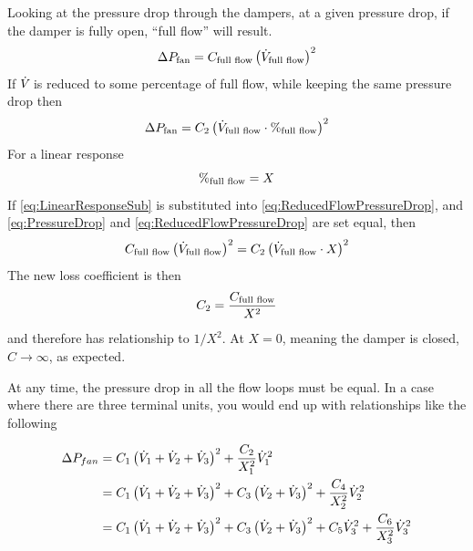 Looking at the pressure drop through the dampers, at a given pressure
drop, if the damper is fully open, ``full flow'' will result. 
\begin{equation}\label{eq:PressureDrop}
    \Delta P_{\text{fan}} = C_{\text{full flow}}\left(\dot{V}_{\text{full flow}}\right)^2
\end{equation}
%
If \(\dot{V}_{}\) is reduced to some percentage of full flow, while keeping
the same pressure drop then
\begin{equation}\label{eq:ReducedFlowPressureDrop}
    \Delta P_{\text{fan}} = C_{2}\left(\dot{V}_{\text{full flow}} \cdot \%_{\text{full flow}} \right)^2
\end{equation}
%
For a linear response
%
\begin{equation}\label{eq:LinearResponseSub}
    \%_{\text{full flow}} = X_{}
\end{equation}
If  \ref{eq:LinearResponseSub} is substituted into
 \ref{eq:ReducedFlowPressureDrop}, and 
\ref{eq:PressureDrop} and \ref{eq:ReducedFlowPressureDrop} are set
equal, then
\begin{equation}
    C_{\text{full flow}}\left(\dot{V}_{\text{full flow}}\right)^2 = C_{2}\left(\dot{V}_{\text{full flow}} \cdot X_{} \right)^2
\end{equation}
The new loss coefficient is then 
\begin{equation}
    C_{2} = \frac{C_{\text{full flow}}}{X_{}^{2}}
\end{equation}
and therefore has relationship to \(1/X^2\). At \(X=0\), meaning the
damper is closed, \(C\to \infty\), as expected. 

At any time, the pressure drop in all the flow loops must be equal. In a
case where there are three terminal units, you would end up with
relationships like the following

\begin{align}\label{eq:FanLoopPressureDrop}
    \Delta P_{fan}  &= C_1 \left(\dot{V}_{1}+\dot{V}_{2}+\dot{V}_{3} \right)^2 + \frac{C_2}{X_{1}^2}\dot{V}_{1}^2 \\ 
                    &= C_1 \left(\dot{V}_{1}+\dot{V}_{2}+\dot{V}_{3} \right)^2 + C_3\left(\dot{V}_{2}+\dot{V}_{3} \right)^2 + \frac{C_4}{X_{2}^2}\dot{V}_{2}^2 \\
                    &= C_1 \left(\dot{V}_{1}+\dot{V}_{2}+\dot{V}_{3} \right)^2 + C_3\left(\dot{V}_{2}+\dot{V}_{3} \right)^2 + C_5\dot{V}_{3}^2 + \frac{C_6}{X_{3}^2}\dot{V}_{3}^2
\end{align}

